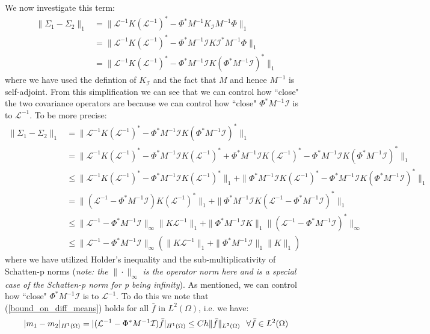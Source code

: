 \documentclass{article}
\theoremstyle{definition}
\theoremstyle{remark}
\begin{document}
We now investigate this term:
\begin{align*}
    \|\Sigma_{1}-\Sigma_2\|_{1}&=\|\mathcal{L}^{-1}K(\mathcal{L}^{-1})^{*}-\Phi^{*}M^{-1}K_{\mathcal{I}}M^{-1}\Phi\|_{1} \\
    &=\|\mathcal{L}^{-1}K(\mathcal{L}^{-1})^{*}-\Phi^{*}M^{-1}\mathcal{I}K\mathcal{I}^{*}M^{-1}\Phi\|_{1} \\
    &=\|\mathcal{L}^{-1}K(\mathcal{L}^{-1})^{*}-\Phi^{*}M^{-1}\mathcal{I}K(\Phi^{*}M^{-1}\mathcal{I})^{*}\|_{1}
\end{align*}
where we have used the defintion of $K_{\mathcal{I}}$ and the fact that $M$ and hence $M^{-1}$ is self-adjoint. From this simplification we can see that we can control how ``close" the two covariance operators are because we can control how ``close" $\Phi^{*}M^{-1}\mathcal{I}$ is to $\mathcal{L}^{-1}$. To be more precise:
\begin{align*}
    \|\Sigma_{1}-\Sigma_{2}\|_{1}&=\|\mathcal{L}^{-1}K(\mathcal{L}^{-1})^{*}-\Phi^{*}M^{-1}\mathcal{I}K(\Phi^{*}M^{-1}\mathcal{I})^{*}\|_{1} \\
    &=\|\mathcal{L}^{-1}K(\mathcal{L}^{-1})^{*}-\Phi^{*}M^{-1}\mathcal{I}K(\mathcal{L}^{-1})^{*}+\Phi^{*}M^{-1}\mathcal{I}K(\mathcal{L}^{-1})^{*}-\Phi^{*}M^{-1}\mathcal{I}K(\Phi^{*}M^{-1}\mathcal{I})^{*}\|_{1} \\
    &\leq\|\mathcal{L}^{-1}K(\mathcal{L}^{-1})^{*}-\Phi^{*}M^{-1}\mathcal{I}K(\mathcal{L}^{-1})^{*}\|_{1} + \|\Phi^{*}M^{-1}\mathcal{I}K(\mathcal{L}^{-1})^{*}-\Phi^{*}M^{-1}\mathcal{I}K(\Phi^{*}M^{-1}\mathcal{I})^{*}\|_{1} \\
    &= \|(\mathcal{L}^{-1}-\Phi^{*}M^{-1}\mathcal{I})K(\mathcal{L}^{-1})^{*}\|_{1} + \|\Phi^{*}M^{-1}\mathcal{I}K(\mathcal{L}^{-1}-\Phi^{*}M^{-1}\mathcal{I})^{*}\|_{1} \\
    &\leq\|\mathcal{L}^{-1}-\Phi^{*}M^{-1}\mathcal{I}\|_{\infty}\|K\mathcal{L}^{-1}\|_{1}+\|\Phi^{*}M^{-1}\mathcal{I}K\|_{1}\|(\mathcal{L}^{-1}-\Phi^{*}M^{-1}\mathcal{I})^{*}\|_{\infty} \\
    &\leq\|\mathcal{L}^{-1}-\Phi^{*}M^{-1}\mathcal{I}\|_{\infty}(\|K\mathcal{L}^{-1}\|_{1}+\|\Phi^{*}M^{-1}\mathcal{I}\|_{1}\|K\|_{1})
\end{align*}
where we have utilized Holder's inequality and the sub-multiplicativity of Schatten-p norms (\textit{note: the} $\|\cdot\|_{\infty}$ \textit{is the operator norm here and is a special case of the Schatten-p norm for p being infinity}). As mentioned, we can control how ``close" $\Phi^{*}M^{-1}\mathcal{I}$ is to $\mathcal{L}^{-1}$. To do this we note that (\ref{bound_on_diff_means}) holds for all $\bar{f}$ in $L^{2}(\Omega)$, i.e. we have:
\begin{equation*}
    |m_1-m_2|_{H^{1}(\Omega)}=|(\mathcal{L}^{-1}-\Phi^{*}M^{-1}\mathcal{I})\bar{f}|_{H^{1}(\Omega)}\leq Ch\|\bar{f}\|_{L^2(\Omega)} \hspace{0.25cm} \forall\bar{f}\in L^{2}(\Omega)
\end{equation*}
\end{document}
